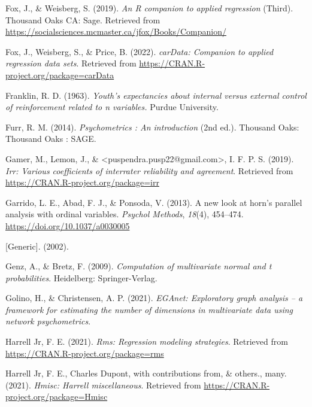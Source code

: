\documentclass[
  man]{apa6}
\newlength{\cslhangindent}
\newlength{\cslentryspacingunit} %
\newenvironment{CSLReferences}[2] %
 {%
  \setlength{\parindent}{0pt}
  \ifodd #1
  \let\oldpar\par
  \def\par{\hangindent=\cslhangindent\oldpar}
  \fi
  \setlength{\parskip}{#2\cslentryspacingunit}
 }%
 {}
\begin{document}
\begin{CSLReferences}{1}{0}
\leavevmode{}%
Fox, J., \& Weisberg, S. (2019). \emph{An {R} companion to applied regression} (Third). Thousand Oaks {CA}: Sage. Retrieved from \url{https://socialsciences.mcmaster.ca/jfox/Books/Companion/}

\leavevmode{}%
Fox, J., Weisberg, S., \& Price, B. (2022). \emph{carData: Companion to applied regression data sets}. Retrieved from \url{https://CRAN.R-project.org/package=carData}

\leavevmode{}%
Franklin, R. D. (1963). \emph{Youth's expectancies about internal versus external control of reinforcement related to n variables.} Purdue University.

\leavevmode{}%
Furr, R. M. (2014). \emph{Psychometrics : An introduction} (2nd ed.). Thousand Oaks: Thousand Oaks : SAGE.

\leavevmode{}%
Gamer, M., Lemon, J., \& \textless puspendra.pusp22@gmail.com\textgreater, I. F. P. S. (2019). \emph{Irr: Various coefficients of interrater reliability and agreement}. Retrieved from \url{https://CRAN.R-project.org/package=irr}

\leavevmode{}%
Garrido, L. E., Abad, F. J., \& Ponsoda, V. (2013). A new look at horn's parallel analysis with ordinal variables. \emph{Psychol Methods}, \emph{18}(4), 454--474. \url{https://doi.org/10.1037/a0030005}

\leavevmode{}%
{[}Generic{]}. (2002).

\leavevmode{}%
Genz, A., \& Bretz, F. (2009). \emph{Computation of multivariate normal and t probabilities}. Heidelberg: Springer-Verlag.

\leavevmode{}%
Golino, H., \& Christensen, A. P. (2021). \emph{EGAnet: Exploratory graph analysis -- a framework for estimating the number of dimensions in multivariate data using network psychometrics}.

\leavevmode{}%
Harrell Jr, F. E. (2021). \emph{Rms: Regression modeling strategies}. Retrieved from \url{https://CRAN.R-project.org/package=rms}

\leavevmode{}%
Harrell Jr, F. E., Charles Dupont, with contributions from, \& others., many. (2021). \emph{Hmisc: Harrell miscellaneous}. Retrieved from \url{https://CRAN.R-project.org/package=Hmisc}


\end{CSLReferences}
\end{document}
